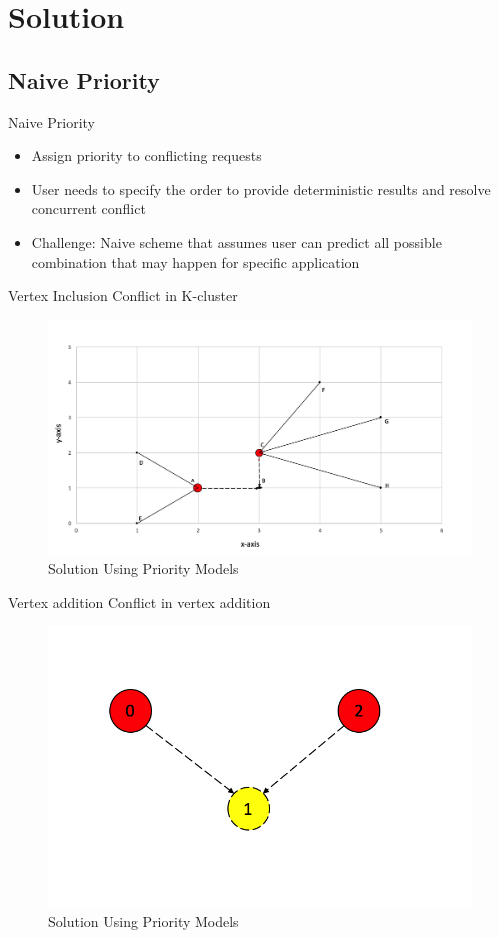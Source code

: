 \section{Solution}
\subsection{Naive Priority}

\begin{frame}{Naive Priority}
  \begin{itemize}
    \item Assign priority to conflicting requests
    \item User needs to specify the order to provide deterministic results and resolve concurrent conflict
    \item Challenge: Naive scheme that assumes user can predict all possible combination that may happen for specific application
  \end{itemize}
  \end{frame}

\begin{frame}{Vertex Inclusion}
	Conflict in K-cluster
			\begin{figure}
			\includegraphics[width=0.6\linewidth]{figures/priority2.png}
			\caption{Solution Using Priority Models}
			\end{figure}
\end{frame}

\begin{frame}{Vertex addition}
	Conflict in vertex addition
			\begin{figure}
			\includegraphics[width=0.6\linewidth]{figures/priority1.png}
			\caption{Solution Using Priority Models}
			\end{figure}
\end{frame}


